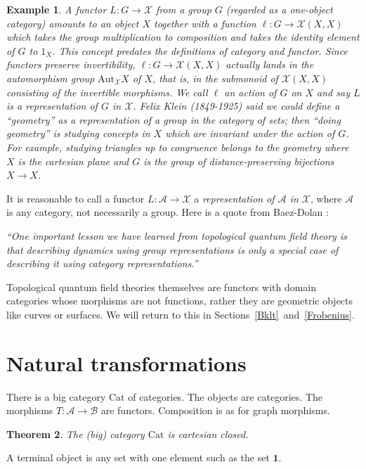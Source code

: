 \documentclass[a4paper,12pt]{article}
\newtheorem{theorem}{Theorem}[section]
\newtheorem{example}[theorem]{Example}
\theoremstyle{step}
\def\CA{{\mathscr A}}
\def\CB{{\mathscr B}}
\def\CX{{\mathscr X}}
\begin{document}
\begin{example}\label{gpreps} A functor $L : G\to \CX$ from a group $G$ (regarded as a one-object category) amounts to an object $X$ together with a function $\ell : G\to \CX(X,X)$ which
takes the group multiplication to composition and takes the identity element of $G$ to $1_X$.
This concept predates the definitions of category and functor. Since functors preserve invertibility, $\ell : G\to \CX(X,X)$ actually lands in the {\em automorphism group} $\mathrm{Aut}_{\CX}X$ of $X$, that is, in the submonoid of $\CX(X,X)$ consisting of the 
invertible morphisms. 
We call $\ell$ an {\em action} of $G$ on $X$ and say $L$ is a {\em representation} of $G$ in $\CX$. Felix Klein (1849-1925) said we could define a ``geometry'' as a representation of a
group in the category of sets; then ``doing geometry'' is studying concepts in $X$ which
are invariant under the action of $G$. For example, studying triangles up to congruence belongs to the geometry where $X$ is the cartesian plane and $G$ is the group
of distance-preserving bijections $X\to X$.     
\end{example}

It is reasonable to call a functor $L : \CA\to \CX$ a {\em representation of $\CA$ in $\CX$}, where $\CA$ is any category, not necessarily a group. Here is a quote from Baez-Dolan \cite{BaeDol1}:

\textit {``One important lesson we have learned from topological quantum field theory is that describing dynamics using group representations is only a special case of describing it using category representations.''} 

Topological quantum field theories themselves are functors with domain categories whose morphisms
are not functions, rather they are geometric objects like curves or surfaces. We will return to this in Sections~\ref{Bklt}~and~\ref{Frobenius}.

\section{Natural transformations}\label{NatTrans}

There is a big category $\mathrm{Cat}$ of categories. The objects are categories.
The morphisms $T : \CA\to \CB$ are functors. Composition is as for graph morphisms.

\begin{theorem} The (big) category $\mathrm{Cat}$ is cartesian closed. 
\end{theorem}
A terminal object is any set with one element such as the set $\mathbf{1}$. 
\end{document}
